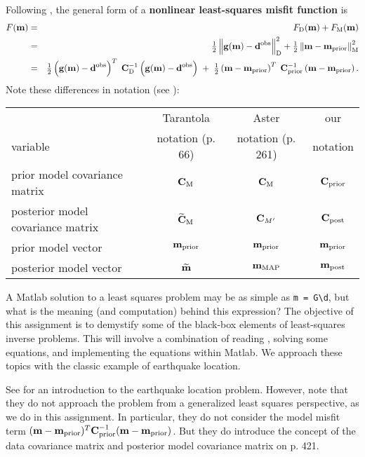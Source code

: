 \documentclass[11pt,titlepage,fleqn]{article}
\begin{document}
Following \citet[][p.~205]{Tarantola2005}, the general form of a {\bf nonlinear least-squares misfit function} is
%
\begin{eqnarray*}
\misfitvar(\mvec) &=& \misfitvar_{\rm D}(\mvec) + \misfitvar_{\rm M}(\mvec) 
\\
&=& \hlf \left\| \bg(\mvec) - \dvec \right\|^2_{\rm D} + \hlf \left\| \mvec - \mprior \right\|^2_{\rm M}
\nonumber \\
&=& \hlf \left( \bg(\mvec) - \dvec\right)^T \; \covdi \left( \bg(\mvec) - \dvec \right)
\;+\; \hlf \left( \mvec - \mprior \right)^T \; \cpriori \left( \mvec - \mprior \right).
\nonumber
\end{eqnarray*}
%
Note these differences in notation (see ):

\vspace{0.2cm}
\begin{tabular}{l|c|c|c}
\hline
                                    & Tarantola         & Aster    & our \\ 
variable                            & notation (p. 66) & notation (p. 261)  & notation \\ \hline
prior model covariance matrix       & $\mbox{${\bf C}$}_{\rm M}$                & $\mbox{${\bf C}$}_{\rm M}$    & $\mbox{${\bf C}$}_{\rm prior}$    \\ \hline
posterior model covariance matrix   & $\widetilde{\mbox{${\bf C}$}}_{\rm M}$    & $\mbox{${\bf C}$}_{M'}$      & $\mbox{${\bf C}$}_{\rm post}$     \\ \hline
prior model vector                  & $\mbox{${\bf m}$}_{\rm prior}$                  & $\mbox{${\bf m}$}_{\rm prior}$      & $\mbox{${\bf m}$}_{\rm prior}$     \\ \hline
posterior model vector              & $\widetilde{\mbox{${\bf m}$}}$         & $\mbox{${\bf m}$}_{\rm MAP}$ & $\mbox{${\bf m}$}_{\rm post}$     \\ \hline
\hline
\end{tabular}
\vspace{0.2cm}

A Matlab solution to a least squares problem may be as simple as \verb+m = G\d+, but what is the meaning (and computation) behind this expression? The objective of this assignment is to demystify some of the black-box elements of least-squares inverse problems. This will involve a combination of reading \citet{Tarantola2005}, solving some equations, and implementing the equations within Matlab. We approach these topics with the classic example of earthquake location.

See \citet[][Chapter 7]{SteinWysession} for an introduction to the earthquake location problem. However, note that they do not approach the problem from a generalized least squares perspective, as we do in this assignment. In particular, they do not consider the model misfit term $(\mbox{${\bf m}$}-\mbox{${\bf m}$}_{\rm prior})^T \mbox{${\bf C}$}_{\rm prior}^{-1} (\mbox{${\bf m}$}-\mbox{${\bf m}$}_{\rm prior})$. But they do introduce the concept of the data covariance matrix and posterior model covariance matrix on p. 421.
\end{document}

